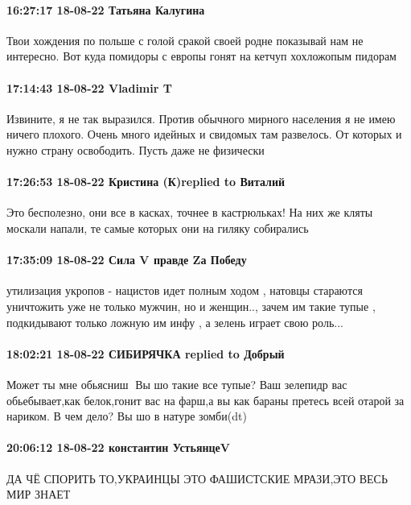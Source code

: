 \paragraph{16:27:17 18-08-22 Татьяна Калугина}

Твои хождения по польше с голой сракой своей родне показывай нам не интересно.
Вот куда помидоры с европы гонят на кетчуп хохложопым пидорам

\paragraph{17:14:43 18-08-22 Vladimir T}

Извините, я не так выразился.
Против обычного мирного населения я не имею ничего плохого. Очень много идейных и свидомых там развелось. От которых и нужно страну освободить.
Пусть даже не физически

\paragraph{17:26:53 18-08-22 Кристина (К)replied to Виталий}

Это бесполезно, они все в касках, точнее в кастрюльках! На них же кляты москали
напали, те самые которых они на гиляку собирались

\paragraph{17:35:09 18-08-22 Сила V правде Zа Победу}

утилизация укропов - нацистов идет полным ходом , натовцы стараются уничтожить
уже не только мужчин, но и женщин.., зачем им такие тупые , подкидывают только
ложную им инфу , а зелень играет свою роль...

\paragraph{18:02:21 18-08-22 СИБИРЯЧКА replied to Добрый}

Может ты мне обьясниш🤔
Вы шо такие все тупые?
Ваш зелепидр вас обьебывает,как белок,гонит вас
на фарш,а вы как бараны претесь всей отарой за нариком.
В чем дело?
Вы шо в натуре зомби(dt)

\paragraph{20:06:12 18-08-22 константин УстьянцеV}

ДА ЧЁ СПОРИТЬ ТО,УКРАИНЦЫ ЭТО ФАШИСТСКИЕ МРАЗИ,ЭТО ВЕСЬ МИР ЗНАЕТ

